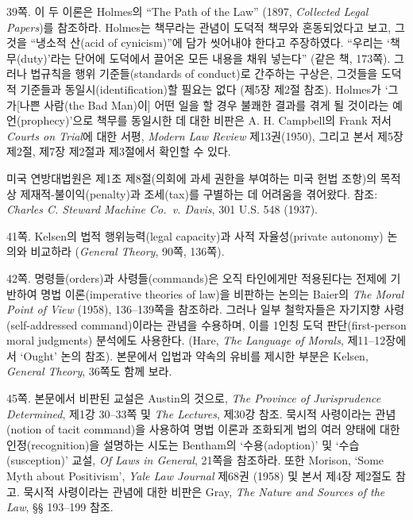 {\noteentry 39쪽.  이 두
이론은 Holmes의 “The Path of the Law” (1897, \emph{Collected Legal
Papers})를 참조하라. Holmes는 책무라는 관념이 도덕적 책무와 혼동되었다고
보고, 그것을 “냉소적 산(acid of cynicism)”에 담가 씻어내야 한다고
주장하였다. “우리는 ‘책무(duty)’라는 단어에 도덕에서 끌어온 모든 내용을
채워 넣는다” (같은 책, 173쪽). 그러나 법규칙을 행위 기준들(standards of
conduct)로 간주하는 구상은, 그것들을 도덕적 기준들과
동일시(identification)할 필요는 없다 (제5장 제2절 참조). Holmes가
‘그가{[}나쁜 사람(the Bad Man)이{]} 어떤 일을 할 경우 불쾌한 결과를 겪게
될 것이라는 예언(prophecy)’으로 책무를 동일시한 데 대한 비판은 A. H.
Campbell의 Frank 저서 \emph{Courts on Trial}에 대한 서평, \emph{Modern
Law Review} 제13권(1950), 그리고 본서 제5장 제2절, 제7장 제2절과
제3절에서 확인할 수 있다.

미국 연방대법원은 제1조 제8절(의회에 과세 권한을 부여하는 미국 헌법
조항)의 목적상 제재적-불이익(penalty)과 조세(tax)를 구별하는 데 어려움을
겪어왔다. 참조: \emph{Charles C. Steward Machine Co.~v. Davis}, 301 U.S.
548 (1937).

\noteentry 41쪽.  Kelsen의 법적 행위능력(legal capacity)과 사적
자율성(private autonomy) 논의와 비교하라 (\emph{General Theory}, 90쪽,
136쪽).

\noteentry 42쪽.  명령들(orders)과 사령들(commands)은 오직 타인에게만
적용된다는 전제에 기반하여 명법 이론(imperative theories of law)을
비판하는 논의는 Baier의 \emph{The Moral Point of View} (1958),
136--139쪽을 참조하라. 그러나 일부 철학자들은 자기지향
사령(self-addressed command)이라는 관념을 수용하며, 이를 1인칭 도덕
판단(first-person moral judgments) 분석에도 사용한다. (Hare, \emph{The
Language of Morals}, 제11--12장에서 `Ought' 논의 참조). 본문에서 입법과
약속의 유비를 제시한 부분은 Kelsen, \emph{General Theory}, 36쪽도 함께
보라.

\noteentry 45쪽.  본문에서
비판된 교설은 Austin의 것으로, \emph{The Province of Jurisprudence
Determined}, 제1강 30--33쪽 및 \emph{The Lectures}, 제30강 참조. 묵시적
사령이라는 관념(notion of tacit command)을 사용하여 명법 이론과 조화되게
법의 여러 양태에 대한 인정(recognition)을 설명하는 시도는 Bentham의
‘수용(adoption)’ 및 ‘수습(susception)’ 교설, \emph{Of Laws in General},
21쪽을 참조하라. 또한 Morison, `Some Myth about Positivism', \emph{Yale
Law Journal} 제68권 (1958) 및 본서 제4장 제2절도 참고. 묵시적 사령이라는
관념에 대한 비판은 Gray, \emph{The Nature and Sources of the Law}, §§
193--199 참조.

}
